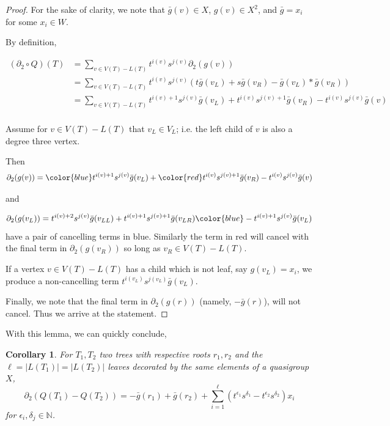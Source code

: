 \documentclass[11pt]{amsart}
\newtheorem{corollary}[theorem]{Corollary}
\theoremstyle{definition}
\begin{document}
\begin{proof}
    For the sake of clarity, we note that $\bar g (v) \in X$, $g(v) \in X^2$, and $\bar g = x_i$ for some $x_i \in W$.


By definition, 

\begin{align*}
    (\partial_2 \circ Q)(T) & = \sum_{v \in V(T)-L(T)} t^{i(v)}s^{j(v)} \partial_2(g(v)) \\
    & = \sum_{v \in V(T)-L(T)} t^{i(v)}s^{j(v)} (t \bar g(v_L) + s \bar g (v_R) - \bar g(v_L) * \bar g(v_R)) \\
     & = \sum_{v \in V(T)-L(T)} t^{i(v) +1}s^{j(v)} \bar g(v_L) + t^{i(v)}s^{j(v)+1} \bar g (v_R) - t^{i(v)}s^{j(v)}  \bar g(v) \\
\end{align*}

Assume for $v \in V(T)- L(T)$ that $v_L \in V_L$; i.e. the left child of $v$ is also a degree three vertex.

Then 
\[ \partial_2(g(v)) = {\color{blue} t^{i(v) +1}s^{j(v)} \bar g(v_L)} + {\color{red} t^{i(v)}s^{j(v)+1} \bar g (v_R) } - t^{i(v)}s^{j(v)}  \bar g(v)\]

 and 
 
\[ \partial_2(g(v_L)) = t^{i(v) +2}s^{j(v)} \bar g(v_{LL}) + t^{i(v)+1}s^{j(v)+1} \bar g (v_{LR}) {\color{blue} - t^{i(v)+1}s^{j(v)}  \bar g(v_L) } \]
 have a pair of cancelling terms in blue. Similarly the term in red will cancel with the final term in $\partial_2(g(v_R))$ so long as $v_R \in V(T)- L(T)$. 


If a vertex $v \in V(T)-L(T)$ has a child which is not leaf, say $g(v_L) = x_i$, we produce a non-cancelling term  $t^{i(v_L)} s^{j(v_L)} \bar g(v_L)$. 

Finally, we note that the final term in $\partial_2(g(r))$ (namely, $-\bar{g}(r)$), will not cancel. Thus we arrive at the statement.
\end{proof}

With this lemma, we can quickly conclude,

\begin{corollary}

    For $T_1, T_2$ two trees with respective roots $r_1,r_2$ and the $\ell = |L(T_1)| = |L(T_2)|$ leaves decorated by the same elements of a quasigroup $X$, 
    \[ \partial_2( Q(T_1) - Q(T_2) ) = - \bar g(r_1) + \bar g(r_2) + \sum_{i = 1}^\ell (t^{\epsilon_1} s^{\delta_1} - t^{\epsilon_2} s^{\delta_2}) x_i\] for $\epsilon_i, \delta_j \in \mathbb{N}$.
\end{corollary}
\end{document}
